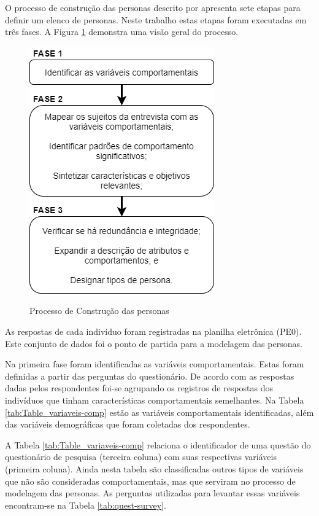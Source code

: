 O processo de construção das personas descrito por  apresenta sete etapas para definir um elenco de personas. Neste trabalho estas etapas foram executadas em três fases. A Figura \ref{Fig:construct_persona.png} demonstra uma visão geral do processo.

\begin{figure}[htbp]
	\centering
	\caption{Processo de Construção das personas}
	\includegraphics[keepaspectratio=true,scale=0.65]{figuras/metodologia/construct_persona.png}
	\label{Fig:construct_persona.png}
\end{figure}


As respostas de cada indivíduo foram registradas na planilha eletrônica (PE0). Este conjunto de dados foi o ponto de partida para a modelagem das personas.

Na primeira fase foram identificadas as variáveis comportamentais. Estas foram definidas a partir das perguntas do questionário. De acordo com as respostas dadas pelos respondentes foi-se agrupando os registros de respostas dos indivíduos que tinham características comportamentais semelhantes. Na Tabela \ref{tab:Table_variaveis-comp} estão as variáveis comportamentais identificadas, além das variáveis demográficas que foram coletadas dos respondentes. 



A Tabela \ref{tab:Table_variaveis-comp} relaciona o identificador de uma questão do questionário de pesquisa (terceira coluna) com suas respectivas variáveis (primeira coluna). Ainda nesta tabela são classificadas outros tipos de variáveis que não são consideradas comportamentais, mas que serviram no processo de modelagem das personas. As perguntas utilizadas para levantar essas variáveis encontram-se na Tabela \ref{tab:quest-survey}.  

